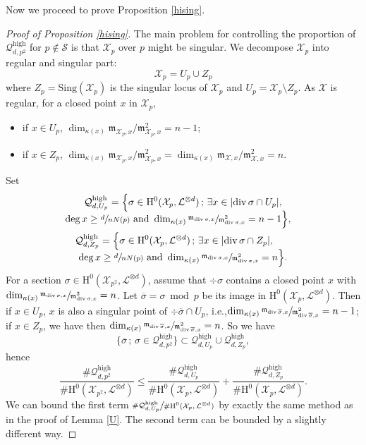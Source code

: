 \documentclass[11pt]{article}
\newcommand{\ie}{i.e.,\xspace}
\numberwithin{equation}{section}
\newcommand{\sep}{\,;\,}
\theoremstyle{plain}
\theoremstyle{definition}
\newcommand{\ho}{\mathrm{H}}
\newcommand{\m}{\mathfrak{m}}
\newcommand{\X}{\mathcal{X}}
\newcommand{\li}{\mathcal{L}}
\begin{document}
Now we proceed to prove Proposition \ref{hising}.
\begin{proof}[Proof of Proposition \ref{hising}]
The main problem for controlling the proportion of $\mathcal{Q}_{d,p^2}^{\mathrm{high}}$ for $p\not\in \mathcal{S}$ is that $\X_{p}$ over $p$ might be singular. We decompose $\X_p$ into regular and singular part:\vspace*{-3pt}
\[
\X_p=U_p\cup Z_p
\]
where $Z_p=\mathrm{Sing}(\X_p)$ is the singular locus of $\X_p$ and $U_p=\X_p\setminus Z_p$. As $\X$ is regular, for a closed point $x$ in $\X_p$,
\begin{itemize}
\item
if $x\in U_p$, $\dim_{\kappa(x)}\mathfrak{m}_{\X_p, x}/\mathfrak{m}^2_{\X_p, x}=n-1$;
\item
if $x\in Z_p$, $\dim_{\kappa(x)}\mathfrak{m}_{\X_p, x}/\mathfrak{m}^2_{\X_p, x}=\dim_{\kappa(x)}\mathfrak{m}_{\X, x}/\mathfrak{m}^2_{\X, x}=n$.
\end{itemize}
Set\vspace*{-3pt}
\begin{multline*}
\mathcal{Q}_{d,U_p}^{\mathrm{high}}= \Bigl\{ \sigma\in \ho^0(\X_{p}, \li^{\otimes d})\sep \exists x\in |{\div\sigma\cap U_p}|,\\[-5pt]
\shoveright{\deg x\geq \sfrac{d}{nN(p)}\text{ and } \dim_{\kappa(x)}\sfrac{\m_{\div \sigma,x}}{\m^2_{\div \sigma, x}}=n-1 \Bigr\},}\\
\shoveleft{\mathcal{Q}_{d,Z_p}^{\mathrm{high}}= \Bigl\{ \sigma\in \ho^0(\X_{p}, \li^{\otimes d})\sep \exists x\in |{\div\sigma\cap Z_p}|,}\\[-5pt]
\deg x\geq \sfrac{d}{nN(p)}\text{ and } \dim_{\kappa(x)}\sfrac{\m_{\div \sigma,x}}{\m^2_{\div \sigma, x}}=n \Bigr\}.
\end{multline*}
For a section $\sigma\in \ho^0(\X_{p^2}, \li^{\otimes d})$, assume that $\div \sigma$ contains a closed point $x$ with $\dim_{\kappa(x)}\sfrac{\m_{\div \sigma,x}}{\m^2_{\div \sigma, x}}=n$. Let $\overline{\sigma}=\sigma \bmod p$ be its image in $\ho^0(\X_{p}, \li^{\otimes d})$. Then if $x\in U_p$, $x$ is also a singular point of $\div \overline{\sigma}\cap U_p$, \ie $\dim_{\kappa(x)}\sfrac{\m_{\div \overline{\sigma},x}}{\m^2_{\div \overline{\sigma}, x}}=n-1$; if $x\in Z_p$, we have then $\dim_{\kappa(x)}\sfrac{\m_{\div \overline{\sigma},x}}{\m^2_{\div \overline{\sigma}, x}}=n$. So we have
\[
\{ \overline{\sigma}\sep \sigma \in \mathcal{Q}_{d,p^2}^{\mathrm{high}} \}\subset \mathcal{Q}_{d,U_p}^{\mathrm{high}}\cup \mathcal{Q}_{d,Z_p}^{\mathrm{high}},
\]
hence\vspace*{-3pt}
\[
\frac{\#\mathcal{Q}_{d,p^2}^{\mathrm{high}}}{\#\ho^0(\X_{p^2}, \li^{\otimes d})}\leq \frac{\#\mathcal{Q}_{d,U_p}^{\mathrm{high}}}{\#\ho^0(\X_{p}, \li^{\otimes d})}+\frac{\#\mathcal{Q}_{d,Z_p}^{\mathrm{high}}}{\#\ho^0(\X_{p}, \li^{\otimes d})}.
\]
We can bound the first term $\sfrac{\#\mathcal{Q}_{d,U_p}^{\mathrm{high}}}{\#\ho^0(\X_{p}, \li^{\otimes d})}$ by exactly the same method as in the proof of Lemma \ref{U}. The second term can be bounded by a slightly different way.


\end{proof}
\end{document}
